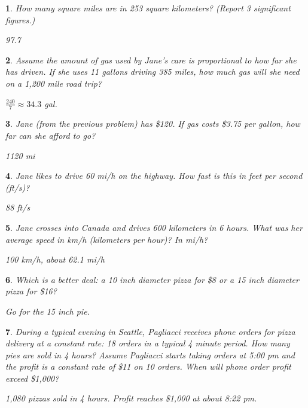 \documentclass{amsbook}
\newtheorem{exc}{}
\newenvironment{ex}{\begin{exc}\normalfont}{\end{exc}}
\numberwithin{section}{chapter}
\numberwithin{equation}{chapter}
\begin{document}
\begin{ex}
	How many square miles are in 253 square kilometers? (Report 3 significant figures.)
	\begin{sol}
		97.7
	\end{sol}
\end{ex}

\begin{ex}
	Assume the amount of gas used by Jane's care is proportional to how far she has driven. If she uses 11 gallons driving 385 miles, how much gas will she need on a 1,200 mile road trip?
	\begin{sol}
		$\frac{240}{7} \approx 34.3$ gal.
	\end{sol}
\end{ex}

\begin{ex}
	Jane (from the previous problem) has \$120. If gas costs \$3.75 per gallon, how far can she afford to go?
	\begin{sol}
		1120 mi
	\end{sol}
\end{ex}

\begin{ex}
	Jane likes to drive 60 mi/h on the highway. How fast is this in feet per second (ft/s)?
	\begin{sol}
		88 ft/s
	\end{sol}
\end{ex}

\begin{ex}
	Jane crosses into Canada and drives 600 kilometers in 6 hours. What was her average speed in km/h (kilometers per hour)? In mi/h?
	\begin{sol}
		100 km/h, about 62.1 mi/h
	\end{sol}
\end{ex}

\begin{ex} %
	Which is a better deal: a 10 inch  diameter pizza for \$8 or a 15 inch diameter pizza for \$16?
	\begin{sol}
		Go for the 15 inch pie.
	\end{sol}
\end{ex}

\begin{ex} %
	During a typical evening in Seattle, \textit{Pagliacci} receives phone orders for pizza delivery at a constant rate: 18 orders in a typical 4 minute period. How many pies are sold in 4 hours? Assume \textit{Pagliacci} starts taking orders at 5:00 pm and the profit is a constant rate of \$11 on 10 orders. When will phone order profit exceed \$1,000?
	\begin{sol}
		1,080 pizzas sold in 4 hours. Profit reaches \$1,000 at about 8:22 pm.
	\end{sol}
\end{ex}
\end{document}
